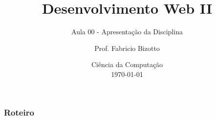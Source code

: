 \documentclass[
	10pt, %
	t, %
]{beamer}
\title[DesWebII]{Desenvolvimento Web II} %
\subtitle{Aula 00 - Apresentação da Disciplina} %
\author[Fabricio Bizotto]{Prof. Fabricio Bizotto} %
\institute[IFC]{Instituto Federal Catarinense \\ \smallskip \textit{fabricio.bizotto@ifc.edu.br}} %
\date[\today]{Ciência da Computação \\ \today} %
\begin{document}

\begin{frame}
	\titlepage %
\end{frame}


\begin{frame}
	\frametitle{Roteiro} %
	
	\tableofcontents %
\end{frame}


\end{document}
